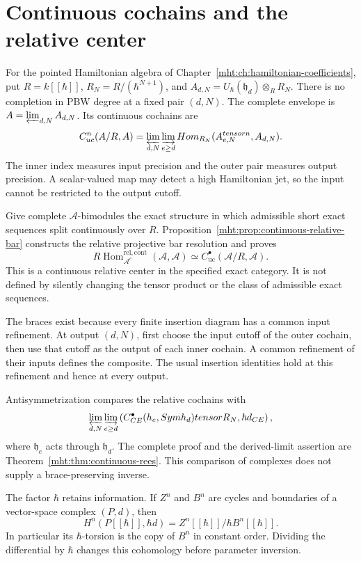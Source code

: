 \section{Continuous cochains and the relative center}

For the pointed Hamiltonian algebra of
Chapter~\ref{mht:ch:hamiltonian-coefficients}, put
$R=k[[\hbar]]$, $R_N=R/(\hbar^{N+1})$, and
$A_{d,N}=U_\hbar(\mathfrak h_d)\otimes_RR_N$.
There is no completion in PBW degree at a fixed pair $(d,N)$.
The complete envelope is $\mathcal A=\varprojlim_{d,N}A_{d,N}$.
Its continuous cochains are
\[
 C^n_{\mathrm{uc}}(\mathcal A/R,\mathcal A)
 =\varprojlim_{d,N}\varinjlim_{e\geq d}
       \operatorname{Hom}_{R_N}(A_{e,N}^{\otimes n},A_{d,N}).
\]
The inner index measures input precision and the outer pair
measures output precision. A scalar-valued map may detect a high
Hamiltonian jet, so the input cannot be restricted to the output
cutoff.

Give complete $\mathcal A$-bimodules the exact structure in which
admissible short exact sequences split continuously over $R$.
Proposition~\ref{mht:prop:continuous-relative-bar} constructs the
relative projective bar resolution and proves
\[
 R\operatorname{Hom}^{\mathrm{rel,cont}}_{\mathcal A^e}
                (\mathcal A,\mathcal A)
 \simeq C^\bullet_{\mathrm{uc}}(\mathcal A/R,\mathcal A).
\]
This is a continuous relative center in the specified exact
category. It is not defined by silently changing the tensor
product or the class of admissible exact sequences.

The braces exist because every finite insertion diagram has a
common input refinement. At output $(d,N)$, first choose the
input cutoff of the outer cochain, then use that cutoff as the
output of each inner cochain. A common refinement of their
inputs defines the composite. The usual insertion identities
hold at this refinement and hence at every output.

Antisymmetrization compares the relative cochains with
\[
 \varprojlim_{d,N}\varinjlim_{e\geq d}
 \left(C^\bullet_{\mathrm{CE}}
   (\mathfrak h_e,\operatorname{Sym}\mathfrak h_d)\otimes R_N,
                          \hbar d_{\mathrm{CE}}\right),
\]
where $\mathfrak h_e$ acts through $\mathfrak h_d$. The complete
proof and the derived-limit assertion are
Theorem~\ref{mht:thm:continuous-rees}. This comparison of complexes
does not supply a brace-preserving inverse.

The factor $\hbar$ retains information. If $Z^n$ and $B^n$ are
cycles and boundaries of a vector-space complex $(P,d)$, then
\[
 H^n(P[[\hbar]],\hbar d)=Z^n[[\hbar]]/\hbar B^n[[\hbar]].
\]
In particular its $\hbar$-torsion is the copy of $B^n$ in constant
order. Dividing the differential by $\hbar$ changes this
cohomology before parameter inversion.

